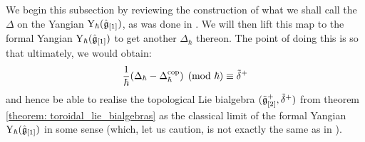         We begin this subsection by reviewing the construction of what we shall call the  $\Delta$ on the Yangian $\mathrm{Y}_{\hbar}(\hat{\mathfrak{g}}_{[1]})$, as was done in \cite[Sections 4 and 5]{guay_nakajima_wendlandt_affine_yangian_coproduct}. We will then lift this map to the formal Yangian $\mathrm{Y}_{\hbar}(\hat{\mathfrak{g}}_{[1]})$ to get another  $\Delta_{\hbar}$ thereon. The point of doing this is so that ultimately, we would obtain:
            $$\frac{1}{\hbar}(\Delta_{\hbar} - \Delta_{\hbar}^{\mathrm{cop}}) \pmod{\hbar} \equiv \tilde{\delta}^+$$
        and hence be able to realise the topological Lie bialgebra $(\tilde{\mathfrak{g}}_{[2]}^+, \tilde{\delta}^+)$ from theorem \ref{theorem: toroidal_lie_bialgebras} as the classical limit of the formal Yangian $\mathrm{Y}_{\hbar}(\hat{\mathfrak{g}}_{[1]})$ in some sense (which, let us caution, is not exactly the same as in \cite{etingof_kazhdan_quantisation_1}).
        
